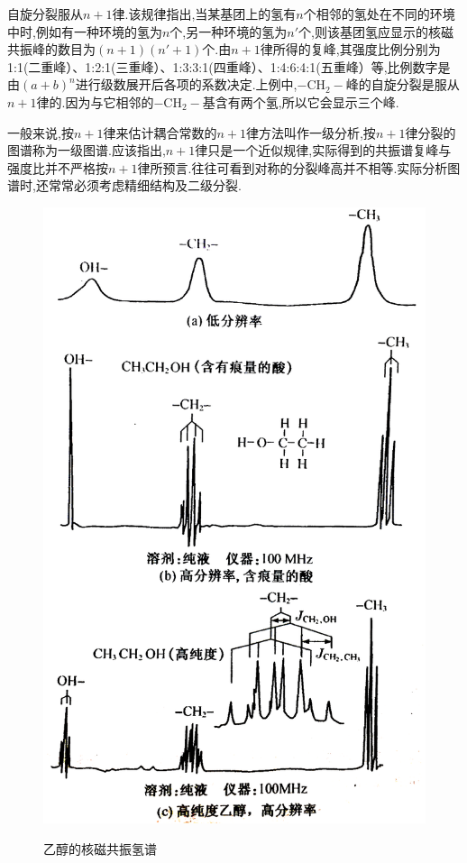 \documentclass[a4paper]{article}
\begin{document}
自旋分裂服从$n+1$律.该规律指出,当某基团上的氢有$n$个相邻的氢处在不同的环境中时,例如有一种环境的氢为$n$个,另一种环境的氢为$n'$个,则该基团氢应显示的核磁共振峰的数目为$(n+1)(n'+1)$个.由$n+1$律所得的复峰,其强度比例分别为1:1(二重峰）、1:2:1(三重峰）、1:3:3:1(四重峰）、1:4:6:4:1(五重峰）等,比例数字是由$(a+b)^n$进行级数展开后各项的系数决定.上例中,$-\text{CH}_2-$峰的自旋分裂是服从$n+1$律的.因为与它相邻的$-\text{CH}_2-$基含有两个氢,所以它会显示三个峰.

一般来说,按$n+1$律来估计耦合常数的$n+1$律方法叫作一级分析,按$n+1$律分裂的图谱称为一级图谱.应该指出,$n+1$律只是一个近似规律,实际得到的共振谱复峰与强度比并不严格按$n+1$律所预言.往往可看到对称的分裂峰高并不相等.实际分析图谱时,还常常必须考虑精细结构及二级分裂.

\begin{figure}[H]
\centering
\includegraphics[height = 0.8\textheight]{fig/5.png}\\
\caption{乙醇的核磁共振氢谱}
\label{Fig4}
\end{figure}
\end{document}

